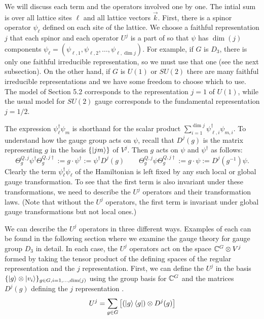 \documentclass[10pt,reqno]{amsart}
\numberwithin{equation}{section}
\begin{document}
	We will discuss each term and the operators involved one by one.
	The intial sum is over all lattice sites $\ell$ and all lattice vectors $\vec{k}$.
	First, there is a spinor operator $\psi_\ell$ defined on each site of the lattice.
	We choose a faithful representation $j$ that each spinor and each operator $U^j$ is a part of so that $\psi$ has $\dim(j)$ components $\psi_\ell=(\psi_{\ell,1},\psi_{\ell,2},\ldots,\psi_{\ell,\dim j})$.
	For example, if $G$ is $D_3$, there is only one faithful irreducible representation, so we must use that one (see the next subsection).
	On the other hand, if $G$ is $U(1)$ or $SU(2)$ there are many faithful irreducible representations and we have some freedom to choose which to use.
	The model of Section 5.2 corresponds to the representation $j=1$ of $U(1)$, while the usual model for $SU(2)$ gauge corresponds to the fundamental representation $j=1/2$.
	
	The expression $\psi_\ell^\dagger\psi_m$ is shorthand for the scalar product $\sum_{i=1}^{\dim j} \psi^\dagger_{\ell,i} \psi_{m,i}$.
	To understand how the gauge group acts on $\psi$, recall that $D^j(g)$ is the matrix representing $g$ in the basis $\{\ket{jm}\}$ of $V^j$.
	Then $g$ acts on $\psi$ and $\psi^\dagger$ as follows:
	\begin{equation}
		\Theta_g^{Q,j} \psi^\dagger \Theta_g^{Q,j \dagger} := g \cdot \psi^\dagger := \psi^\dagger D^j(g) \qquad \Theta_g^{Q,j} \psi \Theta_g^{Q,j \dagger} := g\cdot \psi := D^j(g^{-1}) \psi.
	\end{equation}
	Clearly the term $\psi_\ell^\dagger\psi_\ell$ of the Hamiltonian is left fixed by any such local or global gauge transformation.
	To see that the first term is also invariant under these transformations, we need to describe the $U^j$ operators and their transformation laws.
	(Note that without the $U^j$ operators, the first term is invariant under global gauge transformations but not local ones.)
	
	We can describe the $U^j$ operators in three different ways.
	Examples of each can be found in the following section where we examine the gauge theory for gauge group $D_3$ in detail.
	In each case, the $U^j$ operators act on the space $\mathbb{C}^G \otimes V^j$ formed by taking the tensor product of the defining spaces of the regular representation and the $j$ representation.
	First, we can define the $U^j$ in the basis $\{\ket{g}\otimes\ket{v_i} \}_{g\in G, i=1,\ldots,\dim(j)}$ using the group basis for $\mathbb{C}^G$ and the matrices $D^j(g)$ defining the $j$ representation \cite{TCL14}. 
	\begin{equation}
		U^j=\sum_{g \in G} \left[(\ket{g}\bra{g}) \otimes D^j(g) \right]
	\end{equation}
	
\end{document}
